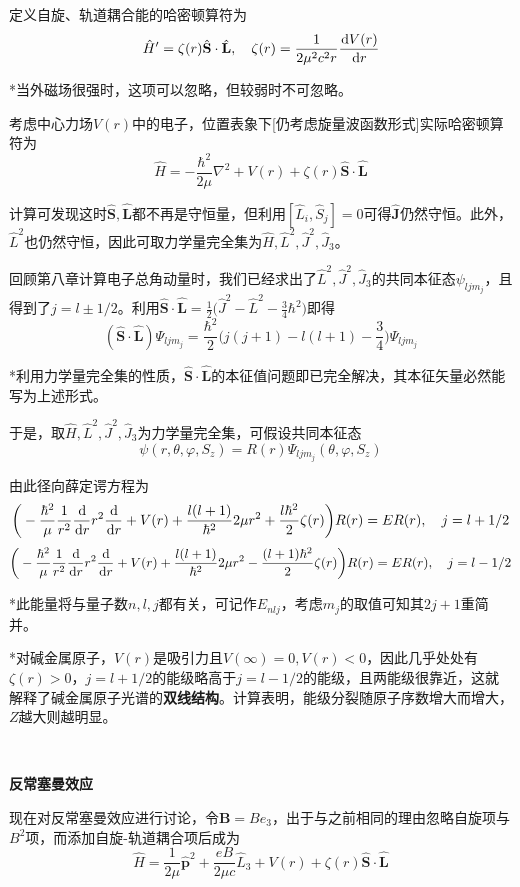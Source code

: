 \documentclass[a4paper,UTF8,fontset=windows]{ctexart}
\newcommand*{\dr}{\hspace{0.07em}\mathrm{d}}
\newcommand*{\bp}{\mathbf{p}}
\newcommand*{\bj}{\mathbf{J}}
\begin{document}
定义自旋、轨道耦合能的哈密顿算符为
$$\hat{H}'=\zeta(r)\hat{\mathbf{S}}\cdot\hat{\mathbf{L}},\quad\zeta(r)=\frac{1}{2\mu^2c^2r}\frac{\dr V(r)}{\dr r}$$

*当外磁场很强时，这项可以忽略，但较弱时不可忽略。

考虑中心力场$V(r)$中的电子，位置表象下[仍考虑旋量波函数形式]实际哈密顿算符为
$$\hat{H}=-\frac{\hbar^2}{2\mu}\nabla^2+V(r)+\zeta(r)\hat{\mathbf{S}}\cdot\hat{\mathbf{L}}$$

计算可发现这时$\hat{\mathbf{S}},\hat{\mathbf{L}}$都不再是守恒量，但利用$[\hat{L}_i,\hat{S}_j]=0$可得$\hat{\bj}$仍然守恒。此外，$\hat{L}^2$也仍然守恒，因此可取力学量完全集为$\hat{H},\hat{L}^2,\hat{J}^2,\hat{J}_3$。

回顾第八章计算电子总角动量时，我们已经求出了$\hat{L}^2,\hat{J}^2,\hat{J}_3$的共同本征态$\psi_{ljm_j}$，且得到了$j=l\pm1/2$。利用$\hat{\mathbf{S}}\cdot\hat{\mathbf{L}}=\frac{1}{2}\big(\hat{J}^2-\hat{L}^2-\frac{3}{4}\hbar^2\big)$即得
$$(\hat{\mathbf{S}}\cdot\hat{\mathbf{L}})\Psi_{ljm_j}=\frac{\hbar^2}{2}\bigg(j(j+1)-l(l+1)-\frac{3}{4}\bigg)\Psi_{ljm_j}$$

*利用力学量完全集的性质，$\hat{\mathbf{S}}\cdot\hat{\mathbf{L}}$的本征值问题即已完全解决，其本征矢量必然能写为上述形式。

于是，取$\hat{H},\hat{L}^2,\hat{J}^2,\hat{J}_3$为力学量完全集，可假设共同本征态
$$\psi(r,\theta,\varphi,S_z)=R(r)\Psi_{ljm_j}(\theta,\varphi,S_z)$$

由此径向薛定谔方程为
$$\bigg(-\frac{\hbar^2}{\mu}\frac{1}{r^2}\frac{\dr}{\dr r}r^2\frac{\dr}{\dr r}+V(r)+\frac{l(l+1)}{\hbar^2}{2\mu r^2}+\frac{l\hbar^2}{2}\zeta(r)\bigg)R(r)=ER(r),\quad j=l+1/2$$
$$\bigg(-\frac{\hbar^2}{\mu}\frac{1}{r^2}\frac{\dr}{\dr r}r^2\frac{\dr}{\dr r}+V(r)+\frac{l(l+1)}{\hbar^2}{2\mu r^2}-\frac{(l+1)\hbar^2}{2}\zeta(r)\bigg)R(r)=ER(r),\quad j=l-1/2$$

*此能量将与量子数$n,l,j$都有关，可记作$E_{nlj}$，考虑$m_j$的取值可知其$2j+1$重简并。

*对碱金属原子，$V(r)$是吸引力且$V(\infty)=0,V(r)<0$，因此几乎处处有$\zeta(r)>0$，$j=l+1/2$的能级略高于$j=l-1/2$的能级，且两能级很靠近，这就解释了碱金属原子光谱的\textbf{双线结构}。计算表明，能级分裂随原子序数增大而增大，$Z$越大则越明显。

\

\textbf{反常塞曼效应}

现在对反常塞曼效应进行讨论，令$\mathbf{B}=Be_3$，出于与之前相同的理由忽略自旋项与$B^2$项，而添加自旋-轨道耦合项后成为
$$\hat{H}=\frac{1}{2\mu}\hat{\bp}^2+\frac{eB}{2\mu c}\hat{L}_3+V(r)+\zeta(r)\hat{\mathbf{S}}\cdot\hat{\mathbf{L}}$$
\end{document}
